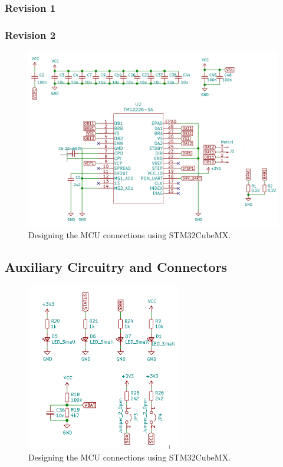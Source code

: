 \subsubsection{Revision 1}
\subsubsection{Revision 2}

\begin{figure}[H]
    \centering
    \includegraphics[width=\textwidth]{obrazky/schem_driver_rev2}
    \caption{Designing the MCU connections using STM32CubeMX.}
    \label{fig:schem_driver}
\end{figure}

\subsection{Auxiliary Circuitry and Connectors}
\label{subsec:aux_connectors}

\begin{figure}[H]
    \centering
    \includegraphics[width=0.6\textwidth]{obrazky/schem_aux}
    \caption{Designing the MCU connections using STM32CubeMX.}
    \label{fig:schem_aux}
\end{figure}


